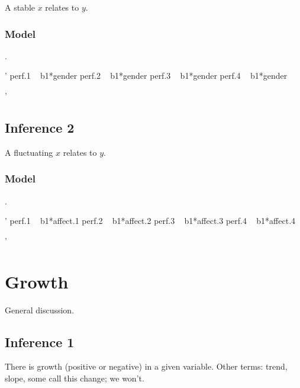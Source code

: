 \documentclass[english,,man]{apa6}
\newenvironment{Shaded}{\begin{snugshade}}{\end{snugshade}}
\newcommand{\StringTok}[1]{\textcolor[rgb]{0.31,0.60,0.02}{#1}}
\theoremstyle{definition}
\theoremstyle{definition}
\theoremstyle{definition}
\theoremstyle{remark}
\begin{document}
A stable \(x\) relates to \(y\).

\hypertarget{model}{%
\subsubsection{Model}\label{model}}

.

\begin{Shaded}
\begin{Highlighting}[]
\StringTok{'}
\StringTok{perf.1 ~ b1*gender}
\StringTok{perf.2 ~ b1*gender}
\StringTok{perf.3 ~ b1*gender}
\StringTok{perf.4 ~ b1*gender}

\StringTok{'}
\end{Highlighting}
\end{Shaded}

\hypertarget{inference-2}{%
\subsection{Inference 2}\label{inference-2}}

A fluctuating \(x\) relates to \(y\).

\hypertarget{model-1}{%
\subsubsection{Model}\label{model-1}}

.

\begin{Shaded}
\begin{Highlighting}[]
\StringTok{'}
\StringTok{perf.1 ~ b1*affect.1}
\StringTok{perf.2 ~ b1*affect.2}
\StringTok{perf.3 ~ b1*affect.3}
\StringTok{perf.4 ~ b1*affect.4}

\StringTok{'}
\end{Highlighting}
\end{Shaded}

\hypertarget{growth}{%
\section{Growth}\label{growth}}

General discussion.

\hypertarget{inference-1-1}{%
\subsection{Inference 1}\label{inference-1-1}}

There is growth (positive or negative) in a given variable. Other terms:
trend, slope, some call this change; we won't.
\end{document}
